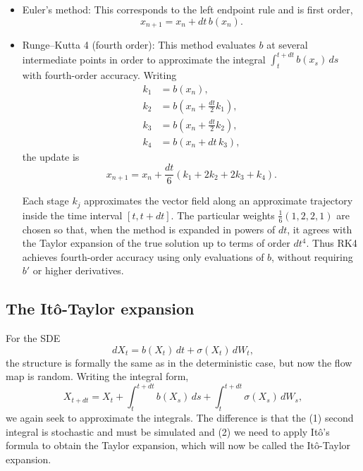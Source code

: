 \documentclass[11pt]{article}
\begin{document}
\begin{itemize}

\item Euler's method: This corresponds to the left endpoint rule and is first order,
\begin{equation}
x_{n+1} = x_n + dt\, b(x_n).
\end{equation}

\item Runge--Kutta 4 (fourth order): This method evaluates $b$ at several intermediate points in order to approximate the integral
\(
\int_t^{t+dt} b(x_s)\,ds
\)
with fourth-order accuracy. Writing
\begin{align}
k_1 &= b(x_n), \\
k_2 &= b\!\left(x_n + \frac{dt}{2}k_1\right), \\
k_3 &= b\!\left(x_n + \frac{dt}{2}k_2\right), \\
k_4 &= b(x_n + dt\, k_3),
\end{align}
the update is
\begin{equation}
x_{n+1}
=
x_n
+
\frac{dt}{6}
\left(
k_1 + 2k_2 + 2k_3 + k_4
\right).
\end{equation}

Each stage $k_j$ approximates the vector field along an approximate trajectory inside the time interval $[t,t+dt]$. The particular weights
\(
\frac{1}{6}(1,2,2,1)
\)
are chosen so that, when the method is expanded in powers of $dt$, it agrees with the Taylor expansion of the true solution up to terms of order $dt^4$. Thus RK4 achieves fourth-order accuracy using only evaluations of $b$, without requiring $b'$ or higher derivatives.

\end{itemize}

\subsection*{The It\^o-Taylor expansion}

For the SDE
\begin{equation}
dX_t = b(X_t)\,dt + \sigma(X_t)\,dW_t,
\end{equation}
the structure is formally the same as in the deterministic case, but now the flow map is random.  Writing the integral form,
\begin{equation}
X_{t+dt}
=
X_t
+
\int_t^{t+dt} b(X_s)\,ds
+
\int_t^{t+dt} \sigma(X_s)\,dW_s,
\end{equation}
we again seek to approximate the integrals.  The difference is that the (1) second integral is stochastic and must be simulated and (2) we need to apply It\^o's formula to obtain the Taylor expansion, which will now be called the It\^o-Taylor expansion. 
\end{document}
